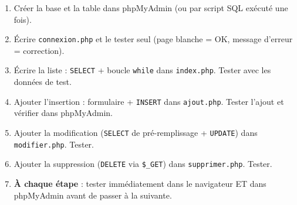 \documentclass[11pt]{article}
\begin{document}
\begin{methode}
\begin{enumerate}
\item Créer la base et la table dans phpMyAdmin (ou par script SQL exécuté une fois).
\item Écrire \texttt{connexion.php} et le tester seul (page blanche = OK, message d'erreur = correction).
\item Écrire la liste : \texttt{SELECT} + boucle \texttt{while} dans \texttt{index.php}. Tester avec les données de test.
\item Ajouter l'insertion : formulaire + \texttt{INSERT} dans \texttt{ajout.php}. Tester l'ajout et vérifier dans phpMyAdmin.
\item Ajouter la modification (\texttt{SELECT} de pré-remplissage + \texttt{UPDATE}) dans \texttt{modifier.php}. Tester.
\item Ajouter la suppression (\texttt{DELETE} via \texttt{\$\_GET}) dans \texttt{supprimer.php}. Tester.
\item \textbf{À chaque étape} : tester immédiatement dans le navigateur ET dans phpMyAdmin avant de passer à la suivante.
\end{enumerate}
\end{methode}
\end{document}
